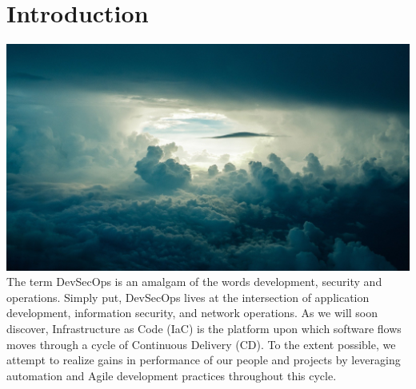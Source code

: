 \chapter{Introduction}

\includegraphics[scale=0.85]{../images/sky-690293_1920.jpg}
\justify
The term DevSecOps is an amalgam of the words development, security and
operations. Simply put, DevSecOps lives at the intersection of
application development, information security, and network operations.
As we will soon discover, Infrastructure as Code (IaC) is the platform
upon which software flows moves through a cycle of Continuous Delivery
(CD). To the extent possible, we attempt to realize gains in performance
of our people and projects by leveraging automation and Agile
development practices throughout this cycle.

